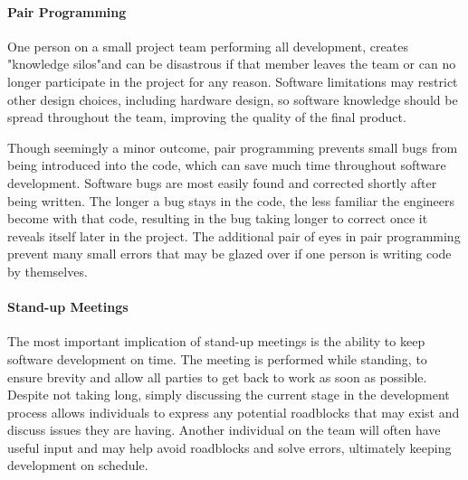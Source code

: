 \paragraph{Pair Programming}
One person on a small project team performing all development, creates "knowledge silos"and can be disastrous if that member leaves the team or can no longer participate in the project for any reason.
Software limitations may restrict other design choices, including hardware design, so software knowledge should be spread throughout the team, improving the quality of the final product. 

Though seemingly a minor outcome, pair programming prevents small bugs from being introduced into the code, which can save much time throughout software development.
Software bugs are most easily found and corrected shortly after being written.
The longer a bug stays in the code, the less familiar the engineers become with that code, resulting in the bug taking longer to correct once it reveals itself later in the project.
The additional pair of eyes in pair programming prevent many small errors that may be glazed over if one person is writing code by themselves.
\paragraph{Stand-up Meetings}
The most important implication of stand-up meetings is the ability to keep software development on time.
The meeting is performed while standing, to ensure brevity and allow all parties to get back to work as soon as possible.
Despite not taking long, simply discussing the current stage in the development process allows individuals to express any potential roadblocks that may exist and discuss issues they are having.
Another individual on the team will often have useful input and may help avoid roadblocks and solve errors, ultimately keeping development on schedule. 